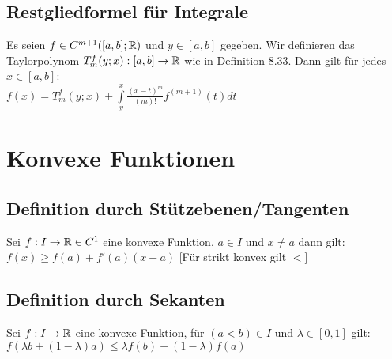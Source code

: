 \documentclass[german]{latex4ei/latex4ei_sheet}
\begin{document}


\begin{sectionbox}
	\subsection{Restgliedformel für Integrale}
	Es seien $f \in C^{m+1}([a,b];\operatorname{\mathbb R})$ und $y \in [a,b]$ gegeben. Wir definieren das Taylorpolynom $T_m^f (y; x) : [a, b] \rightarrow \operatorname{\mathbb R}$ wie in Definition 8.33. Dann gilt für jedes $x \in [a, b]$:\\
	$f(x)=T_m^f(y;x)+ \int \limits_{y}^x \frac{(x-t)^m}{(m)!}f^{(m+1)}(t)dt$


\end{sectionbox}





\section{Konvexe Funktionen}

\begin{sectionbox}
	\subsection{Definition durch Stützebenen/Tangenten}
	Sei $f:I \rightarrow \operatorname{\mathbb R} \in C^1$ eine konvexe Funktion, $a \in I$ und $x \neq a$ dann gilt:\\
	$f(x) \ge f(a)+f'(a)(x-a)$	[Für strikt konvex gilt $<$]
	\end{sectionbox}







\begin{sectionbox}
	\subsection{Definition durch Sekanten}
	Sei $f:I \rightarrow \operatorname{\mathbb R}$ eine konvexe Funktion, für $(a<b) \in I$ und $\lambda \in [0,1] $ gilt:\\
	$f(\lambda b+ (1-\lambda)a) \le \lambda f(b)+ (1-\lambda)f(a) $

\end{sectionbox}
\end{document}
